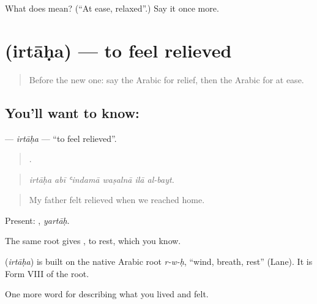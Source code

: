 \begin{tcolorbox}[breakable,colback=teal!4,colframe=teal!35!black,title={Before you move on}]
What does  mean? (\textquotedblleft{}At ease, relaxed\textquotedblright{}.) Say it once more.
\end{tcolorbox}
\section[\texorpdfstring{\ar{ارتاح} (irtāḥa)}{ارتاح (irtāḥa)}]{ (irtāḥa) — to feel relieved}

\label{lesson:AR-C496-irtaha}



\begin{quote}
Before the new one: say the Arabic for relief, then the Arabic for at ease.
\end{quote}

\subsection*{You'll want to know: }
\textbf{} — \emph{irtāḥa} — \textquotedblleft{}to feel relieved\textquotedblright{}.

\begin{quote}
     .
\end{quote}

\begin{quote}
\emph{irtāḥa abī ʿindamā waṣalnā ilā al-bayt.}
\end{quote}

\begin{quote}
My father felt relieved when we reached home.
\end{quote}

Present: , \emph{yartāḥ}.

The same root gives , to rest, which you know.

\begin{cousinweb}
\textbf{} (\emph{irtāḥa}) is built on the native Arabic root \emph{r-w-ḥ}, \textquotedblleft{}wind, breath, rest\textquotedblright{} (Lane). It is Form VIII of the root.
\end{cousinweb}

\begin{grammarlens}[title={What you've built}]
One more word for describing what you lived and felt.
\end{grammarlens}

